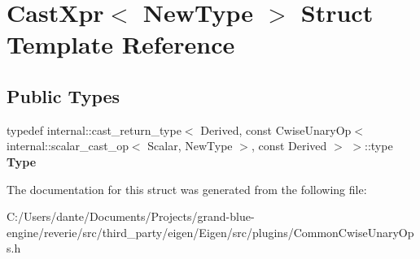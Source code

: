 \hypertarget{struct_cast_xpr}{}\section{Cast\+Xpr$<$ New\+Type $>$ Struct Template Reference}
\label{struct_cast_xpr}
\subsection*{Public Types}
\begin{DoxyCompactItemize}
\item 
\mbox{\label{struct_cast_xpr_a1e5100db77edfeba152c8ee6efe96c95}} 
typedef internal\+::cast\+\_\+return\+\_\+type$<$ Derived, const Cwise\+Unary\+Op$<$ internal\+::scalar\+\_\+cast\+\_\+op$<$ Scalar, New\+Type $>$, const Derived $>$ $>$\+::type {\bfseries Type}
\end{DoxyCompactItemize}


The documentation for this struct was generated from the following file\+:\begin{DoxyCompactItemize}
\item 
C\+:/\+Users/dante/\+Documents/\+Projects/grand-\/blue-\/engine/reverie/src/third\+\_\+party/eigen/\+Eigen/src/plugins/Common\+Cwise\+Unary\+Ops.\+h\end{DoxyCompactItemize}
